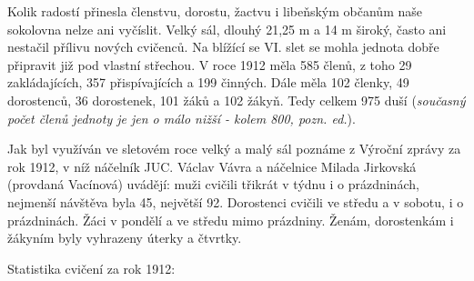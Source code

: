 Kolik radostí přinesla členstvu, dorostu, žactvu i libeňským občanům
naše sokolovna nelze ani vyčíslit. Velký sál, dlouhý 21,25 m a 14 m
široký, často ani nestačil přílivu nových cvičenců. Na blížící se VI.
slet se mohla jednota dobře připravit již pod vlastní střechou. V roce
1912 měla 585 členů, z toho 29 zakládajících, 357 přispívajících a 199
činných. Dále měla 102 členky, 49 dorostenců, 36 dorostenek, 101 žáků a
102 žákyň. Tedy celkem 975 duší (\emph{současný počet členů jednoty je
jen o málo nižší - kolem 800, pozn. ed.}).

Jak byl využíván ve sletovém roce velký a malý sál poznáme z Výroční
zprávy za rok 1912, v níž náčelník JUC. Václav Vávra a náčelnice Milada
Jirkovská (provdaná Vacínová) uvádějí: muži cvičili třikrát v týdnu i o
prázdninách, nejmenší návštěva byla 45, největší 92. Dorostenci cvičili
ve středu a v sobotu, i o prázdninách. Žáci v pondělí a ve středu mimo
prázdniny. Ženám, dorostenkám i žákyním byly vyhrazeny úterky a čtvrtky.

Statistika cvičení za rok 1912:


